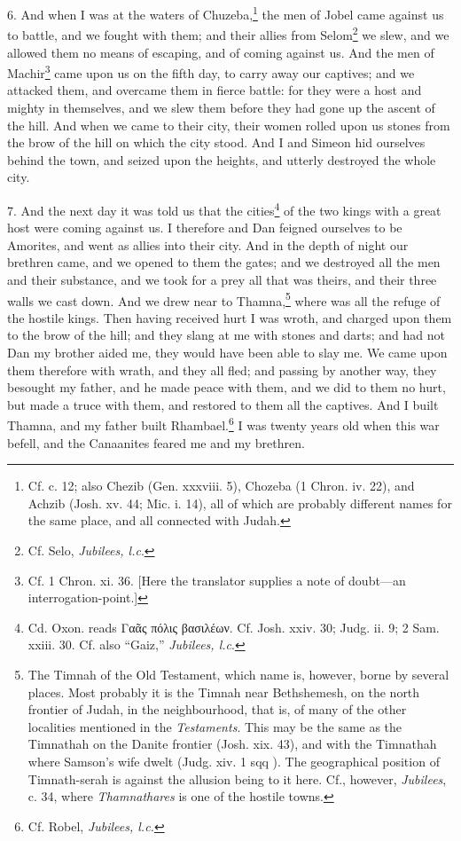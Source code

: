 6. And when I was at the waters of Chuzeba,\footnote{Cf. c. 12; also Chezib (Gen. xxxviii. 5), Chozeba (1 Chron. iv. 22), and Achzib (Josh. xv. 44; Mic. i. 14), all of which are probably different names for the same place, and all connected with Judah.} the men of Jobel came against us to battle, and we fought with them; and their allies from Selom\footnote{Cf. Selo, \emph{Jubilees, l.c}.} we slew, and we allowed them no means of escaping, and of coming against us. And the men of Machir\footnote{Cf. 1 Chron. xi. 36. [Here the translator supplies a note of doubt—an interrogation-point.]} came upon us on the fifth day, to carry away our captives; and we attacked them, and overcame them in fierce battle: for they were a host and mighty in themselves, and we slew them before they had gone up the ascent of the hill. And when we came to their city, their women rolled upon us stones from the brow of the hill on which the city stood. And I and Simeon hid ourselves behind the town, and seized upon the heights, and utterly destroyed the whole city.

7. And the next day it was told us that the cities\footnote{Cd. Oxon. reads \textgreek{Γαᾶς πόλις βασιλέων}. Cf. Josh. xxiv. 30; Judg. ii. 9; 2 Sam. xxiii. 30. Cf. also “Gaiz,” \emph{Jubilees, l.c}.} of the two kings with a great host were coming against us. I therefore and Dan feigned ourselves to be Amorites, and went as allies into their city. And in the depth of night our brethren came, and we opened to them the gates; and we destroyed all the men and their substance, and we took for a prey all that was theirs, and their three walls we cast down. And we drew near to Thamna,\footnote{The Timnah of the Old Testament, which name is, however, borne by several places. Most probably it is the Timnah near Bethshemesh, on the north frontier of Judah, in the neighbourhood, that is, of many of the other localities mentioned in the \emph{Testaments}. This may be the same as the Timnathah on the Danite frontier (Josh. xix. 43), and with the Timnathah where Samson’s wife dwelt (Judg. xiv. 1 sqq ). The geographical position of Timnath-serah is against the allusion being to it here. Cf., however, \emph{Jubilees}, c. 34, where \emph{Thamnathares} is one of the hostile towns.} where was all the refuge of the hostile kings. Then having received hurt I was wroth, and charged upon them to the brow of the hill; and they slang at me with stones and darts; and had not Dan my brother aided me, they would have been able to slay me. We came upon them therefore with wrath, and they all fled; and passing by another way, they besought my father, and he made peace with them, and we did to them no hurt, but made a truce with them, and restored to them all the captives. And I built Thamna, and my father built Rhambael.\footnote{Cf. Robel, \emph{Jubilees, l.c.}} I was twenty years old when this war befell, and the Canaanites feared me and my brethren.

